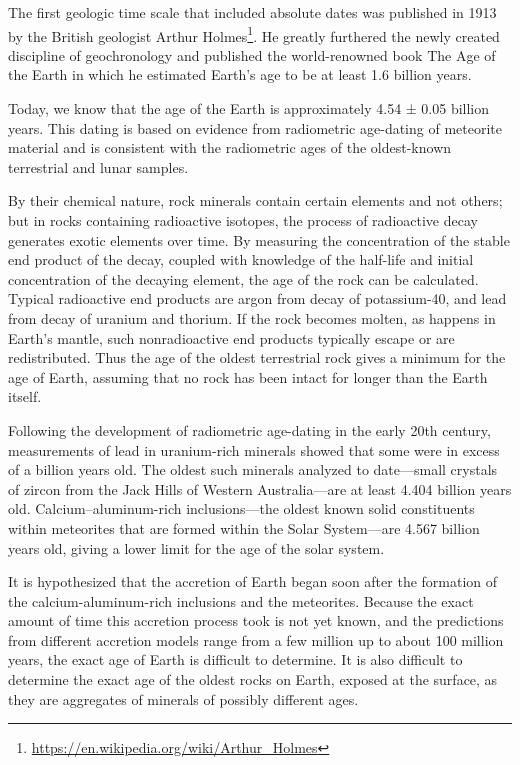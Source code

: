 \documentclass[]{book}
\let\rmarkdownfootnote\footnote%
\def\footnote{\protect\rmarkdownfootnote}
\renewcommand{\href}[2]{#2\footnote{\url{#1}}}
\begin{document}
The first geologic time scale that included absolute dates was published in 1913 by the British geologist \href{https://en.wikipedia.org/wiki/Arthur_Holmes}{Arthur Holmes}. He greatly furthered the newly created discipline of geochronology and published the world-renowned book The Age of the Earth in which he estimated Earth's age to be at least 1.6 billion years.

Today, we know that the age of the Earth is approximately 4.54 ± 0.05 billion years. This dating is based on evidence from radiometric age-dating of meteorite material and is consistent with the radiometric ages of the oldest-known terrestrial and lunar samples.

By their chemical nature, rock minerals contain certain elements and not others; but in rocks containing radioactive isotopes, the process of radioactive decay generates exotic elements over time. By measuring the concentration of the stable end product of the decay, coupled with knowledge of the half-life and initial concentration of the decaying element, the age of the rock can be calculated. Typical radioactive end products are argon from decay of potassium-40, and lead from decay of uranium and thorium. If the rock becomes molten, as happens in Earth's mantle, such nonradioactive end products typically escape or are redistributed. Thus the age of the oldest terrestrial rock gives a minimum for the age of Earth, assuming that no rock has been intact for longer than the Earth itself.

Following the development of radiometric age-dating in the early 20th century, measurements of lead in uranium-rich minerals showed that some were in excess of a billion years old. The oldest such minerals analyzed to date---small crystals of zircon from the Jack Hills of Western Australia---are at least 4.404 billion years old. Calcium--aluminum-rich inclusions---the oldest known solid constituents within meteorites that are formed within the Solar System---are 4.567 billion years old, giving a lower limit for the age of the solar system.

It is hypothesized that the accretion of Earth began soon after the formation of the calcium-aluminum-rich inclusions and the meteorites. Because the exact amount of time this accretion process took is not yet known, and the predictions from different accretion models range from a few million up to about 100 million years, the exact age of Earth is difficult to determine. It is also difficult to determine the exact age of the oldest rocks on Earth, exposed at the surface, as they are aggregates of minerals of possibly different ages.
\end{document}
